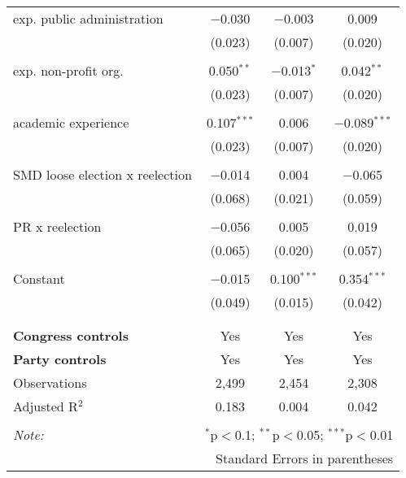 \documentclass{article}
\begin{document}
\begin{table}[!htbp]
\begin{tabular}{@{\extracolsep{5pt}}lccc}
 exp. public administration & $-$0.030 & $-$0.003 & 0.009 \\ 
  & (0.023) & (0.007) & (0.020) \\ 
  & & & \\ 
 exp. non-profit org. & 0.050$^{**}$ & $-$0.013$^{*}$ & 0.042$^{**}$ \\ 
  & (0.023) & (0.007) & (0.020) \\ 
  & & & \\ 
 academic experience & 0.107$^{***}$ & 0.006 & $-$0.089$^{***}$ \\ 
  & (0.023) & (0.007) & (0.020) \\ 
  & & & \\ 
 SMD loose election x reelection & $-$0.014 & 0.004 & $-$0.065 \\ 
  & (0.068) & (0.021) & (0.059) \\ 
  & & & \\ 
 PR x reelection & $-$0.056 & 0.005 & 0.019 \\ 
  & (0.065) & (0.020) & (0.057) \\ 
  & & & \\ 
 Constant & $-$0.015 & 0.100$^{***}$ & 0.354$^{***}$ \\ 
  & (0.049) & (0.015) & (0.042) \\ 
  & & & \\ 
\hline \\[-1.8ex] 
\textbf{Congress controls} & Yes & Yes & Yes \\ 
\textbf{Party controls} & Yes & Yes & Yes \\ 
Observations & 2,499 & 2,454 & 2,308 \\ 
Adjusted R$^{2}$ & 0.183 & 0.004 & 0.042 \\ 
\hline 
\hline \\[-1.8ex] 
\textit{Note:}  & \multicolumn{3}{r}{$^{*}$p$<$0.1; $^{**}$p$<$0.05; $^{***}$p$<$0.01} \\ 
 & \multicolumn{3}{r}{Standard Errors in parentheses} \\ 
\end{tabular} 
\end{table} 
\end{document}
